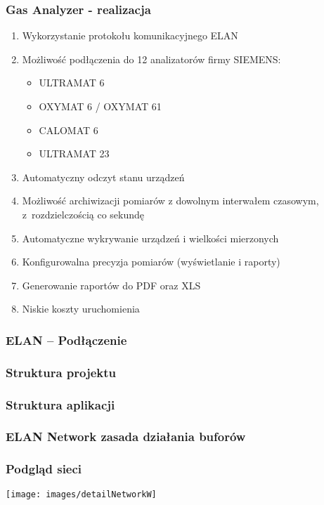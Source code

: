 \documentclass[ucs]{beamer}
\begin{document}
\begin{frame}
\frametitle{Gas Analyzer - realizacja}
\begin{enumerate}
\item Wykorzystanie protokołu komunikacyjnego ELAN
\item Możliwość podłączenia do 12 analizatorów firmy SIEMENS:
\begin{itemize}
\item ULTRAMAT 6
\item OXYMAT 6 / OXYMAT 61
\item CALOMAT 6
\item ULTRAMAT 23
\end{itemize}
\item Automatyczny odczyt stanu urządzeń
\item Możliwość archiwizacji pomiarów z dowolnym interwałem czasowym, z~rozdzielczością co sekundę
\item Automatyczne wykrywanie urządzeń i wielkości mierzonych
\item Konfigurowalna precyzja pomiarów (wyświetlanie i raporty)
\item Generowanie raportów do PDF oraz XLS
\item Niskie koszty uruchomienia
\end{enumerate}
\end{frame}

\begin{frame}
\frametitle{ELAN -- Podłączenie}

\end{frame}

\begin{frame}
\frametitle{Struktura projektu}

\end{frame}

%

\begin{frame}
\frametitle{Struktura aplikacji}
\begin{center}

\end{center}
\end{frame}

\begin{frame}
\frametitle{ELAN Network zasada działania buforów}

\end{frame}

\begin{frame}
\frametitle{Podgląd sieci}
\texttt{[image: images/detailNetworkW]}
\end{frame}
\end{document}
